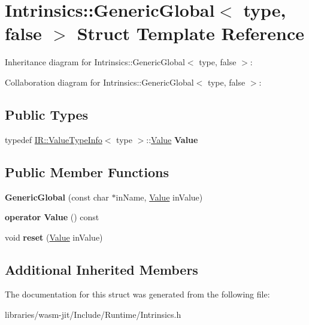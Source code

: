\hypertarget{struct_intrinsics_1_1_generic_global_3_01type_00_01false_01_4}{}\section{Intrinsics\+:\+:Generic\+Global$<$ type, false $>$ Struct Template Reference}
\label{struct_intrinsics_1_1_generic_global_3_01type_00_01false_01_4}


Inheritance diagram for Intrinsics\+:\+:Generic\+Global$<$ type, false $>$\+:


Collaboration diagram for Intrinsics\+:\+:Generic\+Global$<$ type, false $>$\+:
\subsection*{Public Types}
\begin{DoxyCompactItemize}
\item 
\mbox{\label{struct_intrinsics_1_1_generic_global_3_01type_00_01false_01_4_ab9dabce67291a326e222bae31735045f}} 
typedef \mbox{\hyperlink{struct_i_r_1_1_value_type_info}{I\+R\+::\+Value\+Type\+Info}}$<$ type $>$\+::\mbox{\hyperlink{struct_value}{Value}} {\bfseries Value}
\end{DoxyCompactItemize}
\subsection*{Public Member Functions}
\begin{DoxyCompactItemize}
\item 
\mbox{\label{struct_intrinsics_1_1_generic_global_3_01type_00_01false_01_4_a91ce800a589a4c70e9a3133d8dbc8d4b}} 
{\bfseries Generic\+Global} (const char $\ast$in\+Name, \mbox{\hyperlink{struct_value}{Value}} in\+Value)
\item 
\mbox{\label{struct_intrinsics_1_1_generic_global_3_01type_00_01false_01_4_af10c98da12d0a0ac1affe748665db8a7}} 
{\bfseries operator Value} () const
\item 
\mbox{\label{struct_intrinsics_1_1_generic_global_3_01type_00_01false_01_4_ac790359c974b5111d8613ab8d2e479bc}} 
void {\bfseries reset} (\mbox{\hyperlink{struct_value}{Value}} in\+Value)
\end{DoxyCompactItemize}
\subsection*{Additional Inherited Members}


The documentation for this struct was generated from the following file\+:\begin{DoxyCompactItemize}
\item 
libraries/wasm-\/jit/\+Include/\+Runtime/Intrinsics.\+h\end{DoxyCompactItemize}
